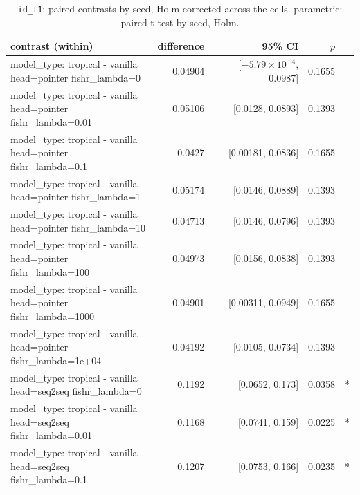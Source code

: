 \documentclass[10pt]{article}
\makeatletter
\newcommand{\stackcell}[1]{\begin{tabular}[t]{@{}l@{}}#1\end{tabular}}
\makeatother
\begin{document}
{\small
\begin{longtable}{lrrrl}
\caption{\texttt{id\_f1}: paired contrasts by seed, Holm-corrected across the cells. parametric: paired t-test by seed, Holm.}\label{tab:paired-id_f1}\\
\toprule
contrast (within) & difference & 95\% CI & $p$ & \\
\midrule
\endhead
\stackcell{model\_type: tropical - vanilla\\\footnotesize head=pointer fishr\_lambda=0 } & 0.04904 & [$-5.79\times10^{-4}$, 0.0987] & 0.1655 & \\
\stackcell{model\_type: tropical - vanilla\\\footnotesize head=pointer fishr\_lambda=0.01 } & 0.05106 & [0.0128, 0.0893] & 0.1393 & \\
\stackcell{model\_type: tropical - vanilla\\\footnotesize head=pointer fishr\_lambda=0.1 } & 0.0427 & [0.00181, 0.0836] & 0.1655 & \\
\stackcell{model\_type: tropical - vanilla\\\footnotesize head=pointer fishr\_lambda=1 } & 0.05174 & [0.0146, 0.0889] & 0.1393 & \\
\stackcell{model\_type: tropical - vanilla\\\footnotesize head=pointer fishr\_lambda=10 } & 0.04713 & [0.0146, 0.0796] & 0.1393 & \\
\stackcell{model\_type: tropical - vanilla\\\footnotesize head=pointer fishr\_lambda=100 } & 0.04973 & [0.0156, 0.0838] & 0.1393 & \\
\stackcell{model\_type: tropical - vanilla\\\footnotesize head=pointer fishr\_lambda=1000 } & 0.04901 & [0.00311, 0.0949] & 0.1655 & \\
\stackcell{model\_type: tropical - vanilla\\\footnotesize head=pointer fishr\_lambda=1e+04 } & 0.04192 & [0.0105, 0.0734] & 0.1393 & \\
\stackcell{model\_type: tropical - vanilla\\\footnotesize head=seq2seq fishr\_lambda=0 } & 0.1192 & [0.0652, 0.173] & 0.0358 & *\\
\stackcell{model\_type: tropical - vanilla\\\footnotesize head=seq2seq fishr\_lambda=0.01 } & 0.1168 & [0.0741, 0.159] & 0.0225 & *\\
\stackcell{model\_type: tropical - vanilla\\\footnotesize head=seq2seq fishr\_lambda=0.1 } & 0.1207 & [0.0753, 0.166] & 0.0235 & *\\

\end{longtable}}
\end{document}
